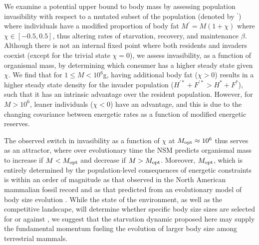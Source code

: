 \documentclass{pnastwo}
\begin{document}
\begin{article}
We examine a potential upper bound to body mass by assessing population invasibility with respect to a mutated subset of the population (denoted by ${}^\prime$) where individuals have a modified proportion of body fat $M^\prime=M(1+\chi)$ where $\chi \in [-0.5,0.5]$, thus altering rates of starvation, recovery, and maintenance $\beta$.
Although there is not an internal fixed point where both residents and invaders coexist (except for the trivial state $\chi=0$), we assess invasibility, as a function of organismal mass, by determining which consumer has a higher steady state given $\chi$.
We find that for $1\leq M<10^6$g, having additional body fat ($\chi > 0$) results in a higher steady state density for the invader population ($H^{\prime *}+F^{\prime *}>H^*+F^*$), such that it has an intrinsic advantage over the resident population.
However, for $M>10^6$, leaner individuals ($\chi < 0$) have an advantage, and this is due to the changing covariance between energetic rates as a function of modified energetic reserves.

The observed switch in invasibility as a function of $\chi$ at $M_{\rm opt}\approx10^6$ thus serves as an attractor, where over evolutionary time the NSM predicts organismal mass to increase if $M<M_{\rm opt}$ and decrease if $M>M_{\rm opt}$.
Moreover, $M_{\rm opt}$, which is entirely determined by the population-level consequences of energetic constraints is within an order of magnitude as that observed in the North American mammalian fossil record \cite{Alroy:1998p1594} and as that predicted from an evolutionary model of body size evolution \cite{Clauset:2009fh}.
While the state of the environment, as well as the competitive landscape, will determine whether specific body size sizes are selected for or against \cite{Saarinen:2014br}, we suggest that the starvation dynamic proposed here may supply the fundamental momentum fueling the evolution of larger body size among terrestrial mammals.


\end{article}
\end{document}
